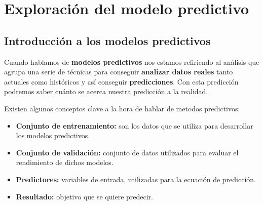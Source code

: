 \cleardoublepage

\chapter{Exploración del modelo predictivo}
\label{makereference4}

\section{Introducción a los modelos predictivos}
\label{makereference4.1}

Cuando hablamos de \textbf{modelos predictivos} nos estamos refiriendo al análisis que agrupa una serie de técnicas para conseguir \textbf{analizar datos reales} tanto actuales como históricos y así conseguir \textbf{predicciones}. Con esta predicción podremos saber cuánto se acerca nuestra predicción a la realidad.

Existen algunos conceptos clave a la hora de hablar de metodos predictivos:

\begin{itemize}
	\item \textbf{Conjunto de entrenamiento:} son los datos que se utiliza para desarrollar los modelos predictivos.
	\item \textbf{Conjunto de validación:} conjunto de datos utilizados para evaluar el rendimiento de dichos modelos.
	\item \textbf{Predictores:} variables de entrada, utilizadas para la ecuación de predicción. 
	\item \textbf{Resultado:} objetivo que se quiere predecir.
\end{itemize}

